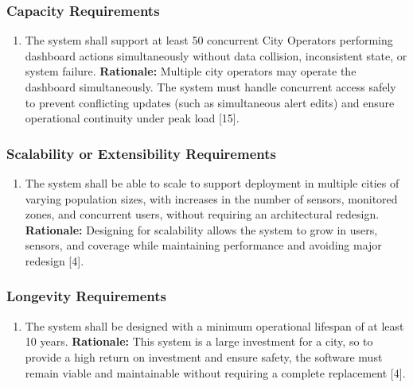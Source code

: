 \documentclass[]{article}
\begin{document}
\subsubsection{Capacity Requirements}
\label{ssub:capacity_requirements}
\begin{enumerate}[{PR-C}1. ]
	\item The system shall support at least 50 concurrent City Operators performing dashboard actions simultaneously without data collision, inconsistent state, or system failure.\newline
	{\bf Rationale:} Multiple city operators may operate the dashboard simultaneously. The system must handle concurrent access safely to prevent conflicting updates (such as simultaneous alert edits) and ensure operational continuity under peak load [15].
\end{enumerate}

\subsubsection{Scalability or Extensibility Requirements}
\label{ssub:scalability_or_extensibility_requirements}
\begin{enumerate}[{PR-SE}1. ]
	\item The system shall be able to scale to support deployment in multiple cities of varying population sizes, with increases in the number of sensors, monitored zones, and concurrent users, without requiring an architectural redesign.\newline
	{\bf Rationale:} Designing for scalability allows the system to grow in users, sensors, and coverage while maintaining performance and avoiding major redesign [4].
\end{enumerate}

\subsubsection{Longevity Requirements}
\label{ssub:longevity_requirements}
\begin{enumerate}[{PR-L}1. ]
	\item The system shall be designed with a minimum operational lifespan of at least 10 years.\newline
	{\bf Rationale:} This system is a large investment for a city, so to provide a high return on investment and ensure safety, the software must remain viable and maintainable without requiring a complete replacement [4].
\end{enumerate}
\end{document}
